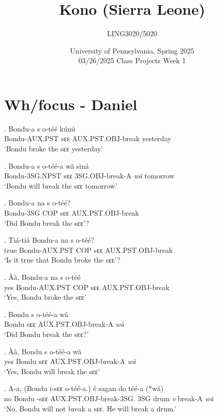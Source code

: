 \documentclass{assets/fieldnotes}
\title{Kono (Sierra Leone)}
\author{LING3020/5020}
\date{University of Pennsylvania, Spring 2025\\03/26/2025 Class Projects Week 1}
\begin{document}
\maketitle

\maketitle
\tableofcontents


\section{Wh/focus - Daniel}
\exg. Bondu-a s o-téé kúnú\\
Bondu-AUX.PST sɛɛ AUX.PST.OBJ-break yesterday\\
`Bondu broke the sɛɛ yesterday'

\exg. Bondu-a s o-téé-a wã sìná\\
Bondu-3SG.NPST sɛɛ 3SG.OBJ-break-A \textit{wã} tomorrow\\
`Bondu will break the sɛɛ tomorrow'

\exg. Bondu-a na s o-téé?\\
Bondu-3SG COP sɛɛ AUX.PST.OBJ-break\\
`Did Bondu break the sɛɛ'?

\exg. Tiá-tiá Bondu-a na s o-téé?\\
true Bondu-AUX.PST COP sɛɛ AUX.PST.OBJ-break\\
`Is it true that Bondu broke the sɛɛ'?\\

\exg. Àà, Bondu-a na s o-téé\\
yes Bondu-AUX.PST COP sɛɛ AUX.PST.OBJ-break\\
`Yes, Bondu broke the sɛɛ'


\exg. Bondu s o-téé-a wã\\
Bondu sɛɛ AUX.PST.OBJ-break-A \textit{wã}\\
`Did Bondu break the sɛɛ?'
 
\exg. Àà, Bondu s o-téé-a wã\\
yes Bondu sɛɛ AUX.PST.OBJ-break-A \textit{wã}\\
`Yes, Bondu will break the sɛɛ'

\exg. A-a, (Bondu i-sɛɛ o-téé-a.) é sagan do téé-a (*wã)\\
no Bondu \Neg{}-sɛɛ AUX.PST.OBJ-break-3SG. 3SG drum \textit{v} break-A \textit{wã}\\
`No, Bondu will not break a sɛɛ. He will break a drum.'
\end{document}
